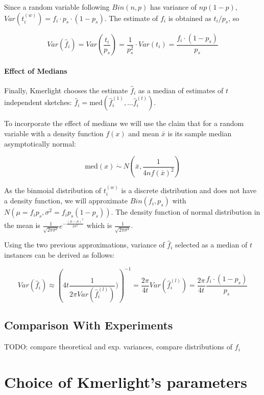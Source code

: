 Since a random variable following $Bin(n, p)$ has variance of $np(1-p)$, 
$Var(t_i^{(w)}) = f_i \cdot p_s \cdot (1-p_s)$. The estimate of $f_i$ is obtained
as $t_i / p_s$, so

$$ Var(\hat f_i) = Var \left( \frac{t_i}{p_s} \right) = \frac{1}{p_s^2} \cdot Var(t_i) = \frac{f_i \cdot (1 - p_s)}{p_s} $$

\paragraph{Effect of Medians}
Finally, Kmerlight chooses the estimate $\hat f_i$ as a median of estimates of $t$ 
independent sketches: $\hat f_i = \mathrm{med}(\hat f_i^{(1)}, \dots \hat f_i^{(t)})$.

To incorporate the effect of medians we will use the claim that for a random
variable with a density function $f(x)$ and mean $\bar x$ is its sample median
asymptotically normal:

$$\mathrm{med}(x) ~\dot\sim~ N\left(\bar x, \frac{1}{4nf(\bar x)^2}\right)$$

As the binmoial distribution of $t_i^{(w)}$ is a discrete distribution and does
not have a density function, we will approximate $Bin(f_i, p_s)$ with
$N(\mu = f_i p_s, \sigma^2 = f_i p_s(1-p_s))$. The density function of normal distribution
in the mean is $\frac{1}{\sqrt{2\pi\sigma^2}} e^{-\frac{(\mu - \mu)^2}{2\sigma^2}}$
which is $\frac{1}{\sqrt{2\pi\sigma^2}}$.

Using the two previous approximations, variance of $\hat f_i$ selected as a median of
$t$ instances can be derived as follows:

$$ Var(\hat f_i) \approx \left( 4t\frac{1}{2\pi Var(\hat f_i^{(l)})}) \right)^{-1} =
\frac{2\pi}{4t} Var(\hat f_i^{(l)}) = \frac{2\pi}{4t} \frac{f_i \cdot (1 - p_s)}{p_s}$$ 


\subsection{Comparison With Experiments}
TODO: compare theoretical and exp. variances, compare distributions of $f_i$

\section{Choice of Kmerlight's parameters}
\label{sec:parameters-choice}
